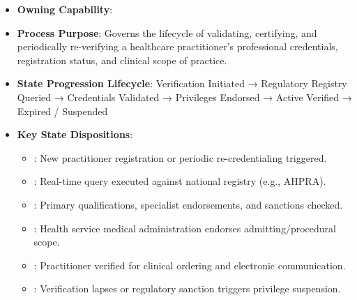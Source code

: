 \begin{itemize}

\item
\textbf{Owning Capability}: \texttt{}



\item
\textbf{Process Purpose}: Governs the lifecycle of validating, certifying, and periodically re-verifying a healthcare practitioner's professional credentials, registration status, and clinical scope of practice.



\item
\textbf{State Progression Lifecycle}: Verification Initiated → Regulatory Registry Queried → Credentials Validated → Privileges Endorsed → Active Verified → Expired /\allowbreak{} Suspended



\item
\textbf{Key State Dispositions}:


\begin{itemize}

\item
\texttt{}: New practitioner registration or periodic re-credentialing triggered.



\item
\texttt{}: Real-time query executed against national registry (e.g., AHPRA).



\item
\texttt{}: Primary qualifications, specialist endorsements, and sanctions checked.



\item
\texttt{}: Health service medical administration endorses admitting/\allowbreak{}procedural scope.



\item
\texttt{}: Practitioner verified for clinical ordering and electronic communication.



\item
\texttt{}: Verification lapses or regulatory sanction triggers privilege suspension.



\end{itemize}


\end{itemize}
\label{rad:processes:98}

